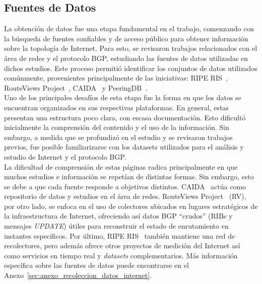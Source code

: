 \subsection{Fuentes de Datos}
La obtención de datos fue una etapa fundamental en el trabajo, comenzando con la búsqueda de fuentes confiables y de acceso público para obtener información sobre la topología de Internet. Para esto, se revisaron trabajos relacionados con el área de redes y el protocolo BGP, estudiando las fuentes de datos utilizadas en dichos estudios. Este proceso permitió identificar los conjuntos de datos utilizados comúnmente, provenientes principalmente de las iniciativas: RIPE RIS~\cite{RIPE-RIS}, RouteViews Project~\cite{RouteViewsProject}, CAIDA~\cite{CAIDA} y PeeringDB~\cite{PeeringDB}.\\


\vspace{0.5cm}
Uno de los principales desafíos de esta etapa fue la forma en que los datos se encuentran 
organizados en sus respectivas plataformas. En general, estas presentan una estructura poco clara, con escasa documentación. Esto dificultó inicialmente la comprensión del contenido y el uso de la información. Sin embargo, a medida que se profundizó en el estudio y se revisaron trabajos previos, fue posible familiarizarse con los datasets utilizados para el análisis y estudio de Internet y el protocolo BGP.\\


La dificultad de comprensión de estas páginas radica principalmente en que muchos estudios e información se repetían de distintas formas. Sin embargo, esto se debe a que cada fuente responde a objetivos distintos. CAIDA~\cite{CAIDA} actúa como repositorio de datos y estudios en el área de redes. RouteViews Project~\cite{RouteViewsProject} (RV), por otro lado, se enfoca en el uso de colectores ubicados en lugares estratégicos de la infraestructura de Internet, ofreciendo así datos BGP ``crudos'' (RIBs y mensajes \textit{UPDATE}) útiles para reconstruir el estado de enrutamiento en instantes específicos. Por último, RIPE RIS~\cite{RIPE-RIS} también mantiene una red de recolectores, pero además ofrece otros proyectos de medición del Internet así como servicios en tiempo real y \textit{datasets} complementarios.
Más información específica sobre las fuentes de datos puede encontrarse en el Anexo~\ref{sec:anexo_recoleccion_datos_internet}.\\

